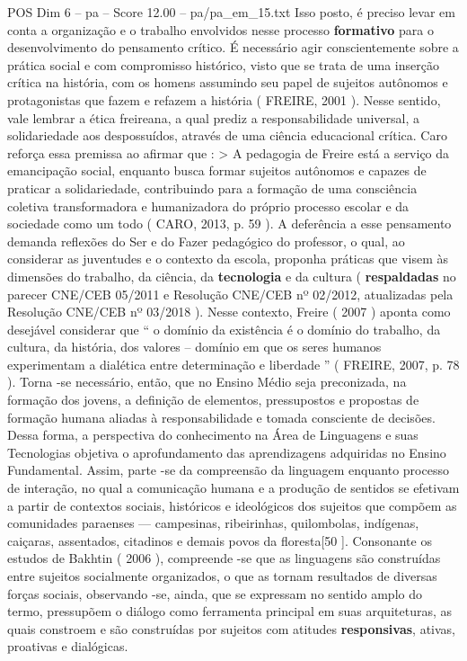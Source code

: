 \begin{textsample}{POS Dim 6 – pa – Score 12.00 – pa/pa\_em\_15.txt}
Isso posto, é preciso levar em conta a organização e o trabalho envolvidos nesse processo \textbf{formativo} para o desenvolvimento do pensamento crítico.
É necessário agir conscientemente sobre a prática social e com compromisso histórico, visto que se trata de uma inserção crítica na história, com os homens assumindo seu papel de sujeitos autônomos e protagonistas que fazem e refazem a história ( FREIRE, 2001 ).
Nesse sentido, vale lembrar a ética freireana, a qual prediz a responsabilidade universal, a solidariedade aos despossuídos, através de uma ciência educacional crítica.
Caro reforça essa premissa ao afirmar que : > A pedagogia de Freire está a serviço da emancipação social, enquanto busca formar sujeitos autônomos e capazes de praticar a solidariedade, contribuindo para a formação de uma consciência coletiva transformadora e humanizadora do próprio processo escolar e da sociedade como um todo ( CARO, 2013, p. 59 ).
A deferência a esse pensamento demanda reflexões do Ser e do Fazer pedagógico do professor, o qual, ao considerar as juventudes e o contexto da escola, proponha práticas que visem às dimensões do trabalho, da ciência, da \textbf{tecnologia} e da cultura ( \textbf{respaldadas} no parecer CNE/CEB 05/2011 e Resolução CNE/CEB nº 02/2012, atualizadas pela Resolução CNE/CEB nº 03/2018 ).
Nesse contexto, Freire ( 2007 ) aponta como desejável considerar que “ o domínio da existência é o domínio do trabalho, da cultura, da história, dos valores – domínio em que os seres humanos experimentam a dialética entre determinação e liberdade ” ( FREIRE, 2007, p. 78 ).
Torna -se necessário, então, que no Ensino Médio seja preconizada, na formação dos jovens, a definição de elementos, pressupostos e propostas de formação humana aliadas à responsabilidade e tomada consciente de decisões.
Dessa forma, a perspectiva do conhecimento na Área de Linguagens e suas Tecnologias objetiva o aprofundamento das aprendizagens adquiridas no Ensino Fundamental.
Assim, parte -se da compreensão da linguagem enquanto processo de interação, no qual a comunicação humana e a produção de sentidos se efetivam a partir de contextos sociais, históricos e ideológicos dos sujeitos que compõem as comunidades paraenses — campesinas, ribeirinhas, quilombolas, indígenas, caiçaras, assentados, citadinos e demais povos da floresta[50 ].
Consonante os estudos de Bakhtin ( 2006 ), compreende -se que as linguagens são construídas entre sujeitos socialmente organizados, o que as tornam resultados de diversas forças sociais, observando -se, ainda, que se expressam no sentido amplo do termo, pressupõem o diálogo como ferramenta principal em suas arquiteturas, as quais constroem e são construídas por sujeitos com atitudes \textbf{responsivas}, ativas, proativas e dialógicas.

\end{textsample}
